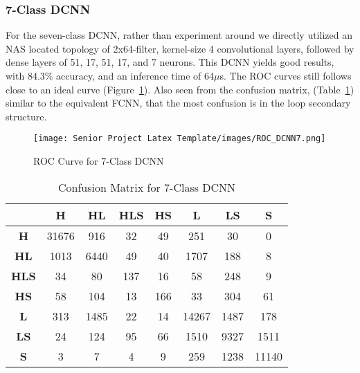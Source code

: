 \documentclass[12pt,letterpaper,oneside,reqno]{book}
\theoremstyle{plain}
\theoremstyle{definition}
\theoremstyle{plain}
\theoremstyle{remark}
\theoremstyle{plain}
\theoremstyle{definition}
\theoremstyle{plain}
\begin{document}
\subsubsection{7-Class DCNN}
For the seven-class DCNN, rather than experiment around we directly utilized an NAS located topology of 2x64-filter, kernel-size 4 convolutional layers, followed by dense layers of 51, 17, 51, 17, and 7 neurons. This DCNN yields good results, with 84.3\% accuracy, and an inference time of 64$\mu$s. The ROC curves still follows close to an ideal curve (Figure~\ref{fig:ROCDCNN7}). Also seen from the confusion matrix, (Table~\ref{tab:confmatdcnn7})  similar to the equivalent FCNN, that the most confusion is in the loop secondary structure.
\begin{figure}[H]
    \centering
    \texttt{[image: Senior Project Latex Template/images/ROC\_DCNN7.png]}
    \caption{ROC Curve for 7-Class DCNN}
    \label{fig:ROCDCNN7}
\end{figure}
\begin{table}[H]
\centering
		\begin{tabular}{|c|c|c|c|c|c|c|c|}
				\hline
				& \textbf{H} & \textbf{HL} & \textbf{HLS} & \textbf{HS} & \textbf{L} & \textbf{LS} & \textbf{S} \\
				\hline
				\textbf{H} & 31676 & 916 & 32 & 49 & 251 & 30 & 0 \\
				\hline
				\textbf{HL} & 1013 & 6440 & 49 & 40 & 1707 & 188 & 8 \\
				\hline
				\textbf{HLS} & 34 & 80 & 137 & 16 & 58 & 248 & 9 \\
				\hline
				\textbf{HS} & 58 & 104 & 13 & 166 & 33 & 304 & 61 \\
				\hline
				\textbf{L} & 313 & 1485 & 22 & 14 & 14267 & 1487 & 178 \\
				\hline
				\textbf{LS} & 24 & 124 & 95 & 66 & 1510 & 9327 & 1511 \\
				\hline
				\textbf{S} & 3 & 7 & 4 & 9 & 259 & 1238 & 11140 \\
				\hline
				
		\end{tabular}
		\caption{Confusion Matrix for 7-Class DCNN}
		\label{tab:confmatdcnn7}
\end{table}
\end{document}

